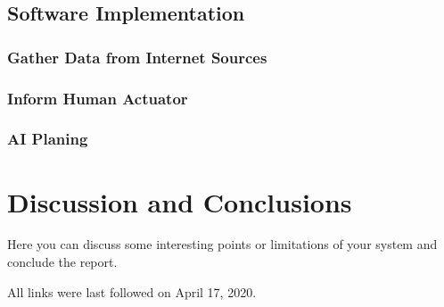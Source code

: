 \documentclass[runningheads]{llncs}
\begin{document}
\subsection{Software Implementation}
\label{imp:soft_imp}

\subsubsection{Gather Data from Internet Sources}\hfill
\label{soft_imp:sensor}
\newline

\subsubsection{Inform Human Actuator}\hfill
\label{soft_imp:actuator}
\newline

\subsubsection{AI Planing}\hfill
\label{soft_imp:ai}
\newline
\section{Discussion and Conclusions}
Here you can discuss some interesting points or limitations of your system and conclude the report.

%
%



All links were last followed on April 17, 2020.
\end{document}
